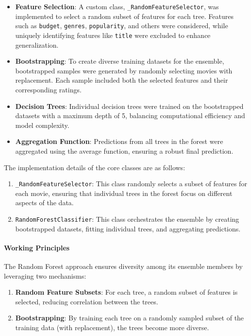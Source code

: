 \documentclass[a4paper,10pt]{article}
\begin{document}
\begin{itemize}
    \item \textbf{Feature Selection}: A custom class, \texttt{\_RandomFeatureSelector}, was implemented to select a random subset of features for each tree. Features such as \texttt{budget}, \texttt{genres}, \texttt{popularity}, and others were considered, while uniquely identifying features like \texttt{title} were excluded to enhance generalization.
    \item \textbf{Bootstrapping}: To create diverse training datasets for the ensemble, bootstrapped samples were generated by randomly selecting movies with replacement. Each sample included both the selected features and their corresponding ratings.
    \item \textbf{Decision Trees}: Individual decision trees were trained on the bootstrapped datasets with a maximum depth of 5, balancing computational efficiency and model complexity.
    \item \textbf{Aggregation Function}: Predictions from all trees in the forest were aggregated using the average function, ensuring a robust final prediction.
\end{itemize}

The implementation details of the core classes are as follows:
\begin{enumerate}
    \item \texttt{\_RandomFeatureSelector}: This class randomly selects a subset of features for each movie, ensuring that individual trees in the forest focus on different aspects of the data.
    \item \texttt{RandomForestClassifier}: This class orchestrates the ensemble by creating bootstrapped datasets, fitting individual trees, and aggregating predictions.
\end{enumerate}

\paragraph{Working Principles}
The Random Forest approach ensures diversity among its ensemble members by leveraging two mechanisms:
\begin{enumerate}
    \item \textbf{Random Feature Subsets}: For each tree, a random subset of features is selected, reducing correlation between the trees.
    \item \textbf{Bootstrapping}: By training each tree on a randomly sampled subset of the training data (with replacement), the trees become more diverse.
\end{enumerate}
\end{document}
